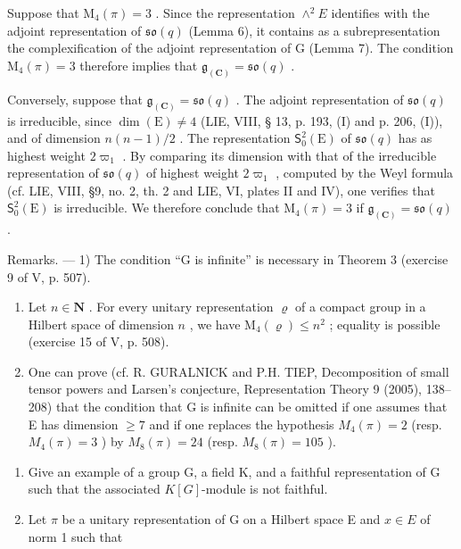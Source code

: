 Suppose that \(\mathrm{M}_{4}(\pi)=3\) . Since the representation \(\wedge^{2}E\) identifies with the adjoint representation of \(\mathfrak{so}(q)\) (Lemma 6), it contains as a subrepresentation the complexification of the adjoint representation of G (Lemma 7). The condition \(\mathrm{M}_{4}(\pi)=3\) therefore implies that \(\mathfrak{g}_{(\mathbf{C})}=\mathfrak{so}(q)\) .

Conversely, suppose that \(\mathfrak{g}_{(\mathbf{C})} = \mathfrak{so}(q)\) . The adjoint representation of \(\mathfrak{so}(q)\) is irreducible, since \(\dim(\mathrm{E}) \neq 4\) (LIE, VIII, § 13, p. 193, (I) and p. 206, (I)), and of dimension \(n(n-1)/2\) . The representation \(\mathsf{S}_0^2(\mathrm{E})\) of \(\mathfrak{so}(q)\) has as highest weight \(2\varpi_1\) . By comparing its dimension with that of the irreducible representation of \(\mathfrak{so}(q)\) of highest weight \(2\varpi_1\) , computed by the Weyl formula (cf. LIE, VIII, §9, no. 2, th. 2 and LIE, VI, plates II and IV), one verifies that \(\mathsf{S}_0^2(\mathrm{E})\) is irreducible. We therefore conclude that \(\mathrm{M}_4(\pi) = 3\) if \(\mathfrak{g}_{(\mathbf{C})} = \mathfrak{so}(q)\) .

Remarks. --- 1) The condition “G is infinite” is necessary in Theorem 3 (exercise 9 of V, p. 507).

\begin{enumerate}
\def\labelenumi{\arabic{enumi})}
\setcounter{enumi}{1}
\item
  Let \(n \in \mathbf{N}\) . For every unitary representation \(\varrho\) of a compact group in a Hilbert space of dimension \(n\) , we have \(\mathrm{M}_{4}(\varrho) \leqslant n^{2}\) ; equality is possible (exercise 15 of V, p. 508).
\item
  One can prove (cf. R. GURALNICK and P.H. TIEP, Decomposition of small tensor powers and Larsen's conjecture, Representation Theory 9 (2005), 138--208) that the condition that G is infinite can be omitted if one assumes that E has dimension \(\geqslant 7\) and if one replaces the hypothesis \(M_{4}(\pi) = 2\) (resp. \(M_{4}(\pi) = 3\) ) by \(M_{8}(\pi) = 24\) (resp. \(M_{8}(\pi) = 105\) ).
\end{enumerate}


\exercisesection{}

\begin{enumerate}
\def\labelenumi{\arabic{enumi})}
\item
  Give an example of a group G, a field K, and a faithful representation of G such that the associated \(K[G]\)-module is not faithful.
\item
  Let \(\pi\) be a unitary representation of G on a Hilbert space E and \(x \in E\) of norm 1 such that
\end{enumerate}

